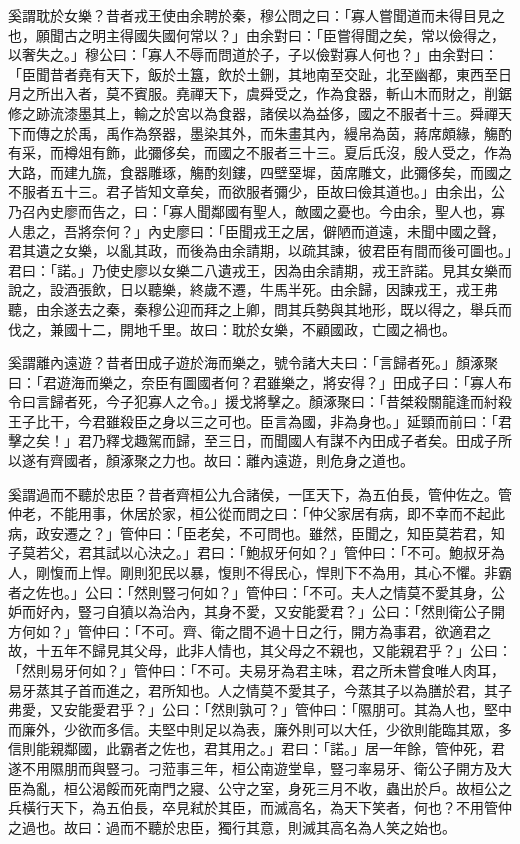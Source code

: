 \begin{pinyinscope}
奚謂耽於女樂？昔者戎王使由余聘於秦，穆公問之曰：「寡人嘗聞道而未得目見之也，願聞古之明主得國失國何常以？」由余對曰：「臣嘗得聞之矣，常以儉得之，以奢失之。」穆公曰：「寡人不辱而問道於子，子以儉對寡人何也？」由余對曰：「臣聞昔者堯有天下，飯於土簋，飲於土鉶，其地南至交趾，北至幽都，東西至日月之所出入者，莫不賓服。堯禪天下，虞舜受之，作為食器，斬山木而財之，削鋸修之跡流漆墨其上，輸之於宮以為食器，諸侯以為益侈，國之不服者十三。舜禪天下而傳之於禹，禹作為祭器，墨染其外，而朱畫其內，縵帛為茵，蔣席頗緣，觴酌有采，而樽俎有飾，此彌侈矣，而國之不服者三十三。夏后氏沒，殷人受之，作為大路，而建九旒，食器雕琢，觴酌刻鏤，四壁堊墀，茵席雕文，此彌侈矣，而國之不服者五十三。君子皆知文章矣，而欲服者彌少，臣故曰儉其道也。」由余出，公乃召內史廖而告之，曰：「寡人聞鄰國有聖人，敵國之憂也。今由余，聖人也，寡人患之，吾將奈何？」內史廖曰：「臣聞戎王之居，僻陋而道遠，未聞中國之聲，君其遺之女樂，以亂其政，而後為由余請期，以疏其諫，彼君臣有間而後可圖也。」君曰：「諾。」乃使史廖以女樂二八遺戎王，因為由余請期，戎王許諾。見其女樂而說之，設酒張飲，日以聽樂，終歲不遷，牛馬半死。由余歸，因諫戎王，戎王弗聽，由余遂去之秦，秦穆公迎而拜之上卿，問其兵勢與其地形，既以得之，舉兵而伐之，兼國十二，開地千里。故曰：耽於女樂，不顧國政，亡國之禍也。

奚謂離內遠遊？昔者田成子遊於海而樂之，號令諸大夫曰：「言歸者死。」顏涿聚曰：「君遊海而樂之，奈臣有圖國者何？君雖樂之，將安得？」田成子曰：「寡人布令曰言歸者死，今子犯寡人之令。」援戈將擊之。顏涿聚曰：「昔桀殺關龍逢而紂殺王子比干，今君雖殺臣之身以三之可也。臣言為國，非為身也。」延頸而前曰：「君擊之矣！」君乃釋戈趣駕而歸，至三日，而聞國人有謀不內田成子者矣。田成子所以遂有齊國者，顏涿聚之力也。故曰：離內遠遊，則危身之道也。

奚謂過而不聽於忠臣？昔者齊桓公九合諸侯，一匡天下，為五伯長，管仲佐之。管仲老，不能用事，休居於家，桓公從而問之曰：「仲父家居有病，即不幸而不起此病，政安遷之？」管仲曰：「臣老矣，不可問也。雖然，臣聞之，知臣莫若君，知子莫若父，君其試以心決之。」君曰：「鮑叔牙何如？」管仲曰：「不可。鮑叔牙為人，剛愎而上悍。剛則犯民以暴，愎則不得民心，悍則下不為用，其心不懼。非霸者之佐也。」公曰：「然則豎刁何如？」管仲曰：「不可。夫人之情莫不愛其身，公妒而好內，豎刁自獖以為治內，其身不愛，又安能愛君？」公曰：「然則衛公子開方何如？」管仲曰：「不可。齊、衛之間不過十日之行，開方為事君，欲適君之故，十五年不歸見其父母，此非人情也，其父母之不親也，又能親君乎？」公曰：「然則易牙何如？」管仲曰：「不可。夫易牙為君主味，君之所未嘗食唯人肉耳，易牙蒸其子首而進之，君所知也。人之情莫不愛其子，今蒸其子以為膳於君，其子弗愛，又安能愛君乎？」公曰：「然則孰可？」管仲曰：「隰朋可。其為人也，堅中而廉外，少欲而多信。夫堅中則足以為表，廉外則可以大任，少欲則能臨其眾，多信則能親鄰國，此霸者之佐也，君其用之。」君曰：「諾。」居一年餘，管仲死，君遂不用隰朋而與豎刁。刁蒞事三年，桓公南遊堂阜，豎刁率易牙、衛公子開方及大臣為亂，桓公渴餒而死南門之寢、公守之室，身死三月不收，蟲出於戶。故桓公之兵橫行天下，為五伯長，卒見弒於其臣，而滅高名，為天下笑者，何也？不用管仲之過也。故曰：過而不聽於忠臣，獨行其意，則滅其高名為人笑之始也。


\end{pinyinscope}
